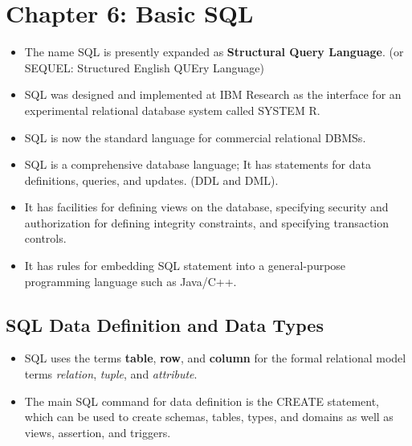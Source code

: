 \documentclass[10pt]{article}
\newcommand{\tf}{\textbf}
\newcommand{\ti}{\textit}
\begin{document}
\section{Chapter 6: Basic SQL}
\begin{itemize}
	\item The name SQL is presently expanded as \tf{Structural Query Language}. (or SEQUEL: Structured English QUEry Language)
	\item SQL was designed and implemented at IBM Research as the interface for an experimental relational database system called SYSTEM R.
	\item SQL is now the standard language for commercial relational DBMSs.
	\item SQL is a comprehensive database language; It has statements for data definitions, queries, and updates. (DDL and DML).
	\item It has facilities for defining views on the database, specifying security and authorization for defining integrity constraints, and specifying transaction controls.
	\item It has rules for embedding SQL statement into a general-purpose programming language such as Java/C++.
\end{itemize}

\subsection{SQL Data Definition and Data Types}

\begin{itemize}
	\item SQL uses the terms \tf{table}, \tf{row}, and \tf{column} for the formal relational model terms \ti{relation}, \ti{tuple}, and \ti{attribute}.
	\item The main SQL command for data definition is the CREATE statement, which can be used to create schemas, tables, types, and domains as well as views, assertion, and triggers. 	
\end{itemize}
\end{document}

